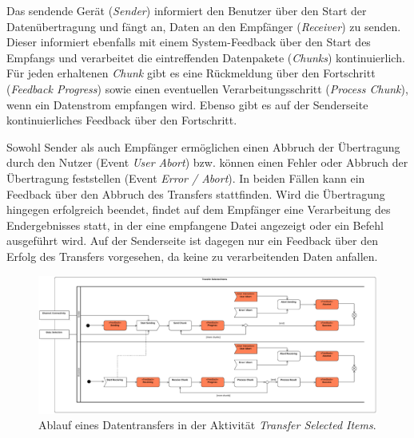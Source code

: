 Das sendende Gerät (\textit{Sender}) informiert den Benutzer über den Start der Datenübertragung und fängt an, Daten an den Empfänger (\textit{Receiver}) zu senden. Dieser informiert ebenfalls mit einem System-Feedback über den Start des Empfangs und verarbeitet die eintreffenden Datenpakete (\textit{Chunks}) kontinuierlich. Für jeden erhaltenen \textit{Chunk} gibt es eine Rückmeldung über den Fortschritt (\textit{Feedback Progress}) sowie einen eventuellen Verarbeitungsschritt (\textit{Process Chunk}), wenn \zb ein Datenstrom empfangen wird. Ebenso gibt es auf der Senderseite kontinuierliches Feedback über den Fortschritt.

Sowohl Sender als auch Empfänger ermöglichen einen Abbruch der Übertragung durch den Nutzer (Event \textit{User Abort}) bzw. können einen Fehler oder Abbruch der Übertragung feststellen (Event \textit{Error / Abort}). In beiden Fällen kann ein Feedback über den Abbruch des Transfers stattfinden. Wird die Übertragung hingegen erfolgreich beendet, findet auf dem Empfänger eine Verarbeitung des Endergebnisses statt, in der \zb eine empfangene Datei angezeigt oder ein Befehl ausgeführt wird. Auf der Senderseite ist dagegen nur ein Feedback über den Erfolg des Transfers vorgesehen, da keine zu verarbeitenden Daten anfallen.
\begin{figure}
\centering
\includegraphics[page=1,width=\textwidth]{bilder/transfer.pdf}
\caption{Ablauf eines Datentransfers in der Aktivität \textit{Transfer Selected Items}.}
\label{fig:transfer_selection}
\end{figure}

